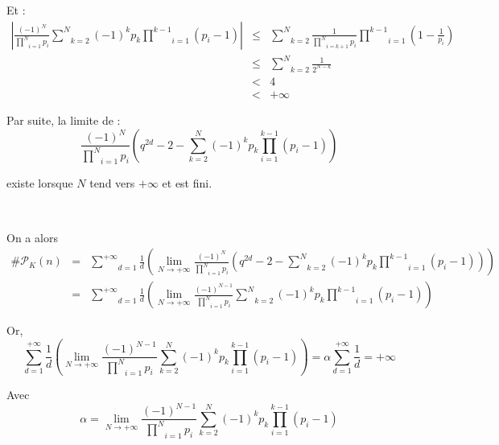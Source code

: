 Et :
\begin{eqnarray*}
  \left| \frac{(- 1)^N}{\underset{i = 1}{\overset{N}{\prod}} p_i} \underset{k
  = 2}{\overset{N}{\sum}} (- 1)^k p_k \underset{i = 1}{\overset{k - 1}{\prod}}
  (p_i - 1) \right| & \leqslant & \underset{k = 2}{\overset{N}{\sum}}
  \frac{1}{\underset{i = k + 1}{\overset{N}{\prod}} p_i} \underset{i =
  1}{\overset{k - 1}{\prod}} \left( 1 - \frac{1}{p_i} \right)\\
  & \leqslant & \underset{k = 2}{\overset{N}{\sum}} \frac{1}{2^{N - k}}\\
  & < & 4\\
  & < & + \infty
\end{eqnarray*}


Par suite, la limite de :
\[ \frac{(- 1)^N}{\underset{i = 1}{\overset{N}{\prod}} p_i} \left( q^{2 d} - 2
   - \underset{k = 2}{\overset{N}{\sum}} (- 1)^k p_k \underset{i =
   1}{\overset{k - 1}{\prod}} (p_i - 1) \right) \]


existe lorsque $N$ tend vers $+ \infty$ et est fini.

\

On a alors
\begin{eqnarray*}
  \#\mathcal{P}_K (n) & = & \underset{d = 1}{\overset{+ \infty}{\sum}}
  \frac{1}{d} \left( \underset{N \rightarrow + \infty}{\lim} \frac{(-
  1)^N}{\underset{i = 1}{\overset{N}{\prod}} p_i} \left( q^{2 d} - 2 -
  \underset{k = 2}{\overset{N}{\sum}} (- 1)^k p_k \underset{i = 1}{\overset{k
  - 1}{\prod}} (p_i - 1) \right) \right)\\
  & = & \underset{d = 1}{\overset{+ \infty}{\sum}} \frac{1}{d} \left(
  \underset{N \rightarrow + \infty}{\lim} \frac{(- 1)^{N - 1}}{\underset{i =
  1}{\overset{N}{\prod}} p_i} \underset{k = 2}{\overset{N}{\sum}} (- 1)^k p_k
  \underset{i = 1}{\overset{k - 1}{\prod}} (p_i - 1) \right)
\end{eqnarray*}


Or,
\[ \underset{d = 1}{\overset{+ \infty}{\sum}} \frac{1}{d} \left( \underset{N
   \rightarrow + \infty}{\lim} \frac{(- 1)^{N - 1}}{\underset{i =
   1}{\overset{N}{\prod}} p_i} \underset{k = 2}{\overset{N}{\sum}} (- 1)^k p_k
   \underset{i = 1}{\overset{k - 1}{\prod}} (p_i - 1) \right) = \alpha
   \underset{d = 1}{\overset{+ \infty}{\sum}} \frac{1}{d} = + \infty \]


Avec
\[ \alpha = \underset{N \rightarrow + \infty}{\lim} \frac{(- 1)^{N -
   1}}{\underset{i = 1}{\overset{N}{\prod}} p_i} \underset{k =
   2}{\overset{N}{\sum}} (- 1)^k p_k \underset{i = 1}{\overset{k - 1}{\prod}}
   (p_i - 1) \]


